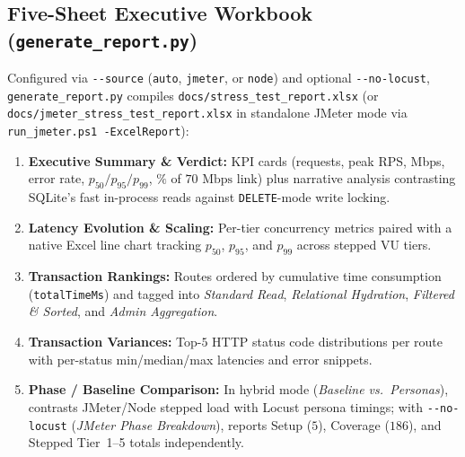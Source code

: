 \documentclass[11pt,letterpaper]{article}
\begin{document}
\subsection{Five-Sheet Executive Workbook (\texttt{generate\_report.py})}
Configured via \texttt{-{}-source} (\texttt{auto}, \texttt{jmeter}, or \texttt{node}) and optional \texttt{-{}-no-locust}, \texttt{generate\_report.py} compiles \texttt{docs/stress\_test\_report.xlsx} (or \texttt{docs/jmeter\_stress\_test\_report.xlsx} in standalone JMeter mode via \texttt{run\_jmeter.ps1 -ExcelReport}):
\begin{enumerate}
  \item \textbf{Executive Summary \& Verdict:} KPI cards (requests, peak RPS, Mbps, error rate, $p_{50}/p_{95}/p_{99}$, $\%$ of $70\text{ Mbps}$ link) plus narrative analysis contrasting SQLite's fast in-process reads against \texttt{DELETE}-mode write locking.
  \item \textbf{Latency Evolution \& Scaling:} Per-tier concurrency metrics paired with a native Excel line chart tracking $p_{50}$, $p_{95}$, and $p_{99}$ across stepped VU tiers.
  \item \textbf{Transaction Rankings:} Routes ordered by cumulative time consumption (\texttt{totalTimeMs}) and tagged into \emph{Standard Read}, \emph{Relational Hydration}, \emph{Filtered \& Sorted}, and \emph{Admin Aggregation}.
  \item \textbf{Transaction Variances:} Top-$5$ HTTP status code distributions per route with per-status min/median/max latencies and error snippets.
  \item \textbf{Phase / Baseline Comparison:} In hybrid mode (\emph{Baseline vs.\ Personas}), contrasts JMeter/Node stepped load with Locust persona timings; with \texttt{-{}-no-locust} (\emph{JMeter Phase Breakdown}), reports Setup ($5$), Coverage ($186$), and Stepped Tier~1--5 totals independently.
\end{enumerate}
\end{document}
